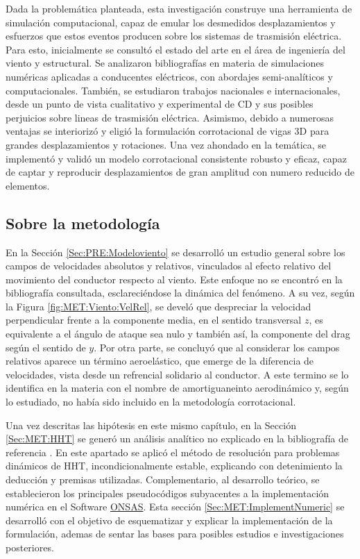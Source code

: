 Dada la problemática planteada, esta investigación construye una herramienta de simulación computacional, capaz de emular los desmedidos desplazamientos y esfuerzos que estos eventos producen sobre los sistemas de trasmisión eléctrica. Para esto, inicialmente se consultó el estado del arte en el área de ingeniería del viento y estructural. Se analizaron bibliografías en materia de simulaciones numéricas aplicadas a conducentes eléctricos, con abordajes semi-analíticos y computacionales. También, se estudiaron trabajos nacionales e internacionales, desde un punto de vista cualitativo y experimental de CD y sus posibles perjuicios sobre lineas de trasmisión eléctrica.  Asimismo, debido a numerosas ventajas se interiorizó y eligió la formulación corrotacional de vigas 3D para grandes desplazamientos y rotaciones. Una vez ahondado en la temática, se implementó y validó un modelo corrotacional consistente robusto y eficaz, capaz de captar y reproducir desplazamientos de gran amplitud con numero reducido de elementos.

\subsection{Sobre la metodología}
En la Sección \ref{Sec:PRE:Modeloviento} se desarrolló un estudio general sobre los campos de velocidades absolutos y relativos, vinculados al efecto relativo del movimiento del conductor respecto al viento. Este enfoque no se encontró en la bibliografía consultada, esclareciéndose la dinámica del fenómeno. A su vez, según la Figura \ref{fig:MET:Viento:VelRel}, se develó que despreciar la velocidad perpendicular frente a la componente media, en el sentido transversal $z$,  es equivalente a el ángulo de ataque sea nulo y también así, la componente del drag según el sentido de $y$. Por otra parte, se concluyó que al considerar los campos relativos aparece un término aeroelástico, que emerge de la diferencia de velocidades, vista desde un refrencial solidario al conductor. A este termino se lo identifica en la materia con el nombre de amortiguaneinto aerodinámico y, según lo estudiado, no había sido incluido en la metodología corrotacional. 

Una vez descritas las hipótesis en este mismo capítulo, en la Sección \ref{Sec:MET:HHT} se generó un análisis analítico no explicado en la bibliografía de referencia \citep{Le2014}. En este apartado se aplicó el método de resolución para problemas dinámicos de HHT, incondicionalmente estable, explicando con detenimiento la deducción y premisas utilizadas. Complementario, al desarrollo teórico, se establecieron los principales pseudocódigos subyacentes a la implementación numérica en el Software \href{https://github.com/ONSAS/ONSAS/}{ONSAS}. Esta sección \ref{Sec:MET:ImplementNumeric} se desarrolló con el objetivo de esquematizar y explicar la implementación de la formulación, ademas de sentar las bases para posibles estudios e investigaciones posteriores. 

